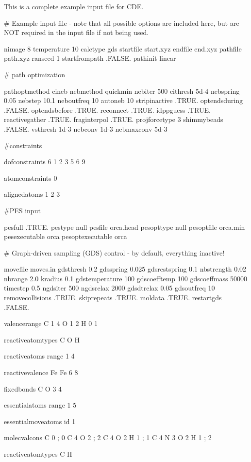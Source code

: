 This is a complete example input file for C\+DE.

\begin{DoxyVerb} # Example input file - note that all possible options are included here, but are NOT required in the input file if not being used.

 nimage 8
 temperature 10
 calctype gds
 startfile start.xyz
 endfile end.xyz
 pathfile path.xyz
 ranseed  1
 startfrompath   .FALSE.
 pathinit  linear

 # path optimization

 pathoptmethod cineb
 nebmethod quickmin
 nebiter 500
 cithresh 5d-4
 nebspring 0.05
 nebstep  10.1
 neboutfreq 10
 autoneb 10
 stripinactive .TRUE.
 optendsduring .FALSE.
 optendsbefore .TRUE.
 reconnect .TRUE.
 idppguess .TRUE.
 reactivegather .TRUE.
 fraginterpol .TRUE.
 projforcetype 3
 shimmybeads .FALSE.
 vsthresh 1d-3
 nebconv 1d-3
 nebmaxconv 5d-3

 #constraints

 dofconstraints 6
 1 2 3 5 6 9

 atomconstraints 0

 alignedatoms
 1 2 3

 #PES input

 pesfull .TRUE.
 pestype  null
 pesfile   orca.head
 pesopttype  null
 pesoptfile orca.min
 pesexecutable orca
 pesoptexecutable orca

 # Graph-driven sampling (GDS) control - by default, everything inactive!

 movefile moves.in
 gdsthresh 0.2
 gdsspring 0.025
 gdsrestspring 0.1
 nbstrength 0.02
 nbrange 2.0
 kradius 0.1
 gdstemperature 100
 gdscoefftemp 100
 gdscoeffmass 50000
 timestep 0.5
 ngdsiter 500
 ngdsrelax 2000
 gdsdtrelax 0.05
 gdsoutfreq 10
 removecollisions .TRUE.
 skiprepeats .TRUE.
 moldata .TRUE.
 restartgds .FALSE.


 valencerange{
 C 1 4
 O 1 2
 H 0 1
 }

 reactiveatomtypes{
 C
 O
 H
 }

 reactiveatoms{
 range 1 4
 }

 reactivevalence{
 Fe Fe 6 8
 }

 fixedbonds{
 C O
 3 4
 }

 essentialatoms{
 range 1 5
 }

 essentialmoveatoms{
 id 1
 }

 molecvalcons{
 C 0 ; 0
 C 4 O 2 ; 2
 C 4 O 2 H 1 ; 1
 C 4 N 3 O 2 H 1 ; 2
 }

 reactiveatomtypes{
 C
 H
 }


\end{DoxyVerb}
